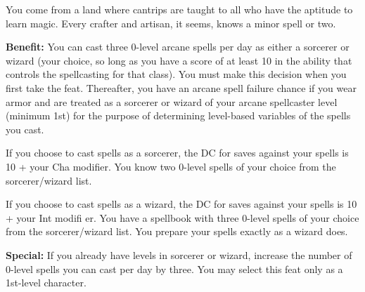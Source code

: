 
You come from a land where cantrips are taught to all who have the aptitude to learn magic. Every crafter and artisan, it seems, knows a minor spell or two.

\textbf{Benefit:} You can cast three 0-level arcane spells per day as either a sorcerer or wizard (your choice, so long as you have a score of at least 10 in the ability that controls the spellcasting for that class). You must make this decision when you first take the feat. Thereafter, you have an arcane spell failure chance if you wear armor and are treated as a sorcerer or wizard of your arcane spellcaster level (minimum 1st) for the purpose of determining level-based variables of the spells you cast.

If you choose to cast spells as a sorcerer, the DC for saves against your spells is 10 + your Cha modifier. You know two 0-level spells of your choice from the sorcerer/wizard list.

If you choose to cast spells as a wizard, the DC for saves against your spells is 10 + your Int modifi er. You have a spellbook with three 0-level spells of your choice from the sorcerer/wizard list. You prepare your spells exactly as a wizard does.

\textbf{Special:} If you already have levels in sorcerer or wizard, increase the number of 0-level spells you can cast per day by three. You may select this feat only as a 1st-level character.